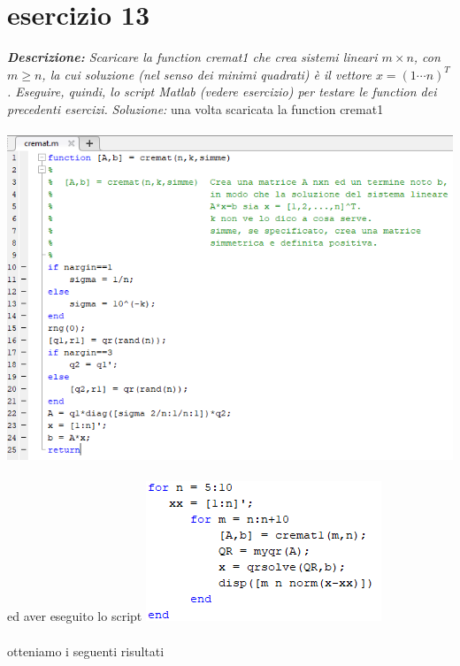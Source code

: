 \section{esercizio 13}
\textit{\textbf{Descrizione:} Scaricare la function cremat1 che crea sistemi lineari $m \times n$, con $m \geq n$, la cui soluzione (nel senso dei minimi quadrati) è il vettore $x = (1 \cdots n)^{T}$. Eseguire, quindi, lo script Matlab (vedere esercizio) per testare le function dei precedenti esercizi.}\newline
\noindent\emph{Soluzione: }\newline
una volta scaricata la function cremat1
\\~\\
\includegraphics[width=1.3\linewidth]{img/cremat.png}\\~\\
ed aver eseguito lo script
\includegraphics[width=.8\linewidth]{img/ex13.png}\\~\\
otteniamo i seguenti risultati
\\~\\
